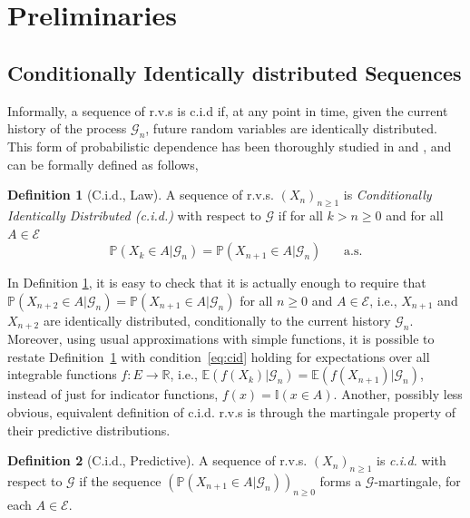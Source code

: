 \documentclass{article}
\theoremstyle{definition}
\newtheorem{definition}{Definition}
\renewcommand{\&}{and}
\begin{document}
\section{Preliminaries}

\subsection{Conditionally Identically distributed Sequences}

Informally, a sequence of r.v.s is c.i.d if, at any point in time, given the current history of the process $\mathcal{G}_{n}$, future random variables are identically distributed. This form of probabilistic dependence has been thoroughly studied in \cite{kal88}
and \cite{berti2004limit}, and can be formally defined as follows, 

 \begin{definition}[C.i.d., Law] \label{def:cid.law}
    A sequence of r.v.s. $(X_{n})_{n\geq 1}$ is  \textit{Conditionally Identically Distributed (c.i.d.)} with respect to $\mathcal{G}$ if for all $k>n\geq 0$ and for all $A \in \mathcal{E}$
\begin{equation} \label{eq:cid}
\mathbb{P}\left( X_{k} \in A  |\mathcal{G}_{n}\right) = \mathbb{P} \left( X_{n+1} \in A | \mathcal{G}_{n}\right)  \ \ \ \ \ \ \ \  \text{a.s.} 
\end{equation}
\end{definition}

In Definition \ref{def:cid.law}, it is easy to check that it is actually enough to require that $\mathbb{P}\left( X_{n+2} \in A  |\mathcal{G}_{n}\right) = \mathbb{P} \left( X_{n+1} \in A | \mathcal{G}_{n}\right)$ for all $n\geq 0$ and $A\in \mathcal{E}$, i.e., $X_{n+1}$ and $X_{n+2}$ are identically distributed, conditionally to the current history $\mathcal{G}_{n}$. Moreover, using usual approximations with simple functions, it is possible to restate Definition~\ref{def:cid.law} with condition~\eqref{eq:cid} holding for expectations over all integrable functions $f:E\to \mathbb{R}$, i.e., $\mathbb{E}\left( f(X_{k})|\mathcal{G}_{n}\right) = \mathbb{E} \left( f(X_{n+1}) | \mathcal{G}_{n}\right)$, instead of just for indicator functions, $f(x)=\mathbb{I}(x\in A)$. Another, possibly less obvious, equivalent definition of c.i.d. r.v.s is through the martingale property of their predictive distributions.%
\begin{definition}[C.i.d., Predictive]\label{def:cid.pred}
 A sequence of r.v.s. $(X_{n})_{n\geq 1}$ is \textit{c.i.d.} with respect to $\mathcal{G}$ if the sequence
   $ \left( \mathbb{P}\left(X_{n+1} \in A |\mathcal{G}_{n} \right) \right)_{n\geq 0}$
forms a $\mathcal{G}$-martingale, for each $A \in \mathcal{E}$.
\end{definition}
\end{document}
